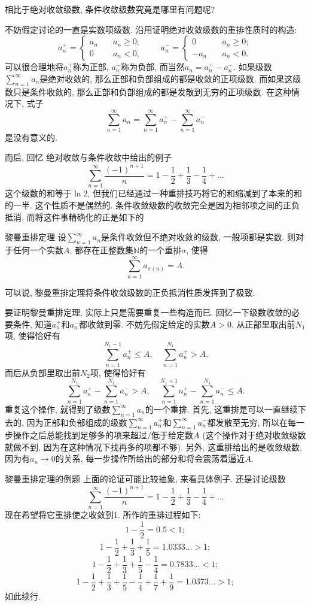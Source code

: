 

相比于绝对收敛级数, 条件收敛级数究竟是哪里有问题呢? 

不妨假定讨论的一直是实数项级数. 沿用证明绝对收敛级数的重排性质时的构造: 
$$
a_n^+=\left\{\begin{array}{cc}
{a_n}\quad &a_n\geq0;\\
0\quad &a_n<0,
\end{array}\right.
\quad\quad
a_n^-=\left\{\begin{array}{cc}
0\quad &a_n\geq0;\\
-a_n\quad &a_n<0.
\end{array}\right.
$$
可以很合理地将$a_n^+$称为正部, $a_n^-$称为负部, 而当然$a_n=a_n^+-a_n^-$. 如果级数$\sum_{n=1}^\infty a_n$是绝对收敛的, 那么正部和负部组成的都是收敛的正项级数. 而如果这级数只是条件收敛的, 那么正部和负部组成的都是发散到无穷的正项级数. 在这种情况下, 式子
$$
\sum_{n=1}^\infty a_n=\sum_{n=1}^\infty a_n^+-\sum_{n=1}^\infty a_n^-
$$
是没有意义的.

而后, 回忆 绝对收敛与条件收敛中给出的例子
$$
\sum_{n=1}^\infty\frac{(-1)^{n+1}}{n}
=1-\frac{1}{2}+\frac{1}{3}-\frac{1}{4}+...
$$
这个级数的和等于$\ln2$, 但我们已经通过一种重排技巧将它的和缩减到了本来的和的一半. 这个性质不是偶然的. 条件收敛级数的收敛完全是因为相邻项之间的正负抵消, 而将这件事精确化的正是如下的

\begin{theorem}{黎曼重排定理}
设$\sum_{n=1}^\infty a_n$是条件收敛但不绝对收敛的级数, 一般项都是实数. 则对于任何一个实数$A$, 都存在正整数集$\mathbb{N}$的一个重排$\sigma$, 使得
$$
\sum_{n=1}^\infty a_{\sigma(n)}=A.
$$
\end{theorem}

可以说, 黎曼重排定理将条件收敛级数的正负抵消性质发挥到了极致.

要证明黎曼重排定理, 实际上只是需要重复一些构造而已. 回忆一下级数收敛的必要条件, 知道$a_n^+$和$a_n^-$都收敛到零. 不妨先假定给定的实数$A>0$. 从正部里取出前$N_1$项, 使得恰好有
\[
\sum_{n=1}^{N_1-1}a_n^+\leq A,
\quad
\sum_{n=1}^{N_1}a_n^+> A.
\]
而后从负部里取出前$N_2$项, 使得恰好有
\[
\sum_{n=1}^{N_1}a_n^+-\sum_{n=1}^{N_1}a_n^-> A,
\quad
\sum_{n=1}^{N_1+1}a_n^+-\sum_{n=1}^{N_1}a_n^-\leq A.
\]
重复这个操作, 就得到了级数$\sum_{n=1}^\infty a_n$的一个重排. 首先, 这重排是可以一直继续下去的, 因为正部和负部组成的级数$\sum_{n=1}^\infty a_n^+$和$\sum_{n=1}^\infty a_n^-$都发散至无穷, 所以在每一步操作之后总能找到足够多的项来超过/低于给定数$A$ (这个操作对于绝对收敛级数就做不到, 因为在这种情况下找再多的项都不够). 另外, 这重排给出的是收敛级数, 因为有$a_n\to0$的关系, 每一步操作所给出的部分和将会震荡着逼近$A$.

\begin{example}{黎曼重排定理的例题}
上面的论证可能比较抽象, 来看具体例子. 还是讨论级数
$$
\sum_{n=1}^\infty\frac{(-1)^{n+1}}{n}
=1-\frac{1}{2}+\frac{1}{3}-\frac{1}{4}+...
$$
现在希望将它重排使之收敛到1. 所作的重排过程如下:
$$
1-\frac{1}{2}=0.5<1;
$$ 
$$
1-\frac{1}{2}+\frac{1}{3}+\frac{1}{5}=1.0333...>1;
$$ 
$$
1-\frac{1}{2}+\frac{1}{3}+\frac{1}{5}-\frac{1}{4}=0.7833...<1;
$$ 
$$
1-\frac{1}{2}+\frac{1}{3}+\frac{1}{5}-\frac{1}{4}+\frac{1}{7}+\frac{1}{9}=1.0373...>1;
$$
如此续行.
\end{example}
